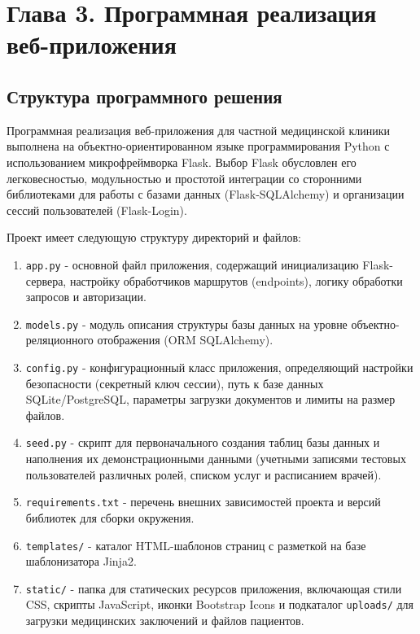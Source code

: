 
\section*{Глава 3. Программная реализация веб-приложения}

\subsection{Структура программного решения}

Программная реализация веб-приложения для частной медицинской клиники выполнена на объектно-ориентированном языке программирования Python с использованием микрофреймворка Flask. Выбор Flask обусловлен его легковесностью, модульностью и простотой интеграции со сторонними библиотеками для работы с базами данных (Flask-SQLAlchemy) и организации сессий пользователей (Flask-Login).

Проект имеет следующую структуру директорий и файлов:
\begin{enumerate}
    \item \texttt{app.py} - основной файл приложения, содержащий инициализацию Flask-сервера, настройку обработчиков маршрутов (endpoints), логику обработки запросов и авторизации.
    \item \texttt{models.py} - модуль описания структуры базы данных на уровне объектно-реляционного отображения (ORM SQLAlchemy).
    \item \texttt{config.py} - конфигурационный класс приложения, определяющий настройки безопасности (секретный ключ сессии), путь к базе данных SQLite/PostgreSQL, параметры загрузки документов и лимиты на размер файлов.
    \item \texttt{seed.py} - скрипт для первоначального создания таблиц базы данных и наполнения их демонстрационными данными (учетными записями тестовых пользователей различных ролей, списком услуг и расписанием врачей).
    \item \texttt{requirements.txt} - перечень внешних зависимостей проекта и версий библиотек для сборки окружения.
    \item \texttt{templates/} - каталог HTML-шаблонов страниц с разметкой на базе шаблонизатора Jinja2.
    \item \texttt{static/} - папка для статических ресурсов приложения, включающая стили CSS, скрипты JavaScript, иконки Bootstrap Icons и подкаталог \texttt{uploads/} для загрузки медицинских заключений и файлов пациентов.
\end{enumerate}

